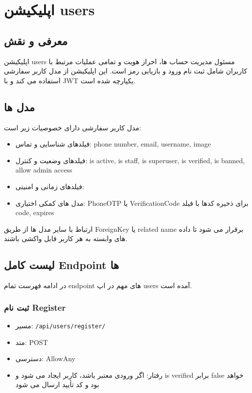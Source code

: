 \section{اپلیکیشن users}
\label{sec:users app}
\subsection{معرفی و نقش}
اپلیکیشن users مسئول مدیریت حساب ها، احراز هویت و تمامی عملیات مرتبط با کاربران شامل ثبت نام ورود و بازیابی رمز است. این اپلیکیشن از مدل کاربر سفارشی استفاده می کند و با JWT یکپارچه شده است.

\subsection{مدل ها}
مدل کاربر سفارشی دارای خصوصیات زیر است:
\begin{itemize}
  \item فیلدهای شناسایی و تماس: phone number, email, username, image
  \item فیلدهای وضعیت و کنترل: is active, is staff, is superuser, is verified, is banned, allow admin access
  \item فیلدهای زمانی و امنیتی: 
  \item مدل های کمکی اختیاری: PhoneOTP یا VerificationCode برای ذخیره کدها با فیلد code, expires
\end{itemize}
ارتباط با سایر مدل ها از طریق ForeignKey یا related name برقرار می شود تا داده های وابسته به هر کاربر قابل واکشی باشند.

\subsection{لیست کامل Endpoint ها}
در ادامه فهرست تمام endpoint های مهم در اپ users آمده است.

\subsubsection{ثبت نام Register}
\begin{itemize}
  \item مسیر: \texttt{/api/users/register/}
  \item متد: POST
  \item دسترسی: AllowAny
  \item رفتار: اگر ورودی معتبر باشد، کاربر ایجاد می شود و is verified برابر false خواهد بود و کد تأیید ارسال می شود
\end{itemize}

